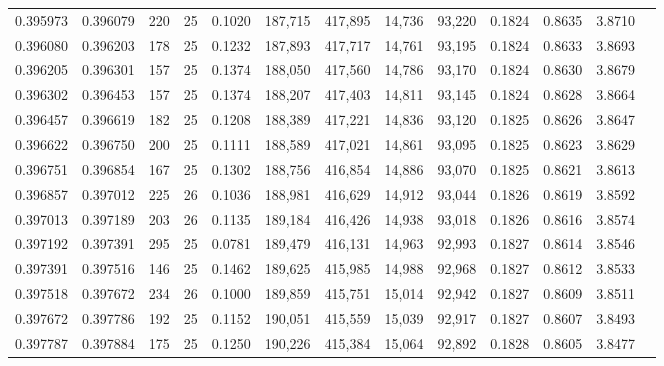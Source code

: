 \begin{tabular}{rrrrrrrrrrrrr}
0.395973 & 0.396079 & 220 &  25 &                                     0.1020 & 187,715 & 417,895 &  14,736 &  93,220 & 0.1824 & 0.8635 & 3.8710 \\
0.396080 & 0.396203 & 178 &  25 &                                     0.1232 & 187,893 & 417,717 &  14,761 &  93,195 & 0.1824 & 0.8633 & 3.8693 \\
0.396205 & 0.396301 & 157 &  25 &                                     0.1374 & 188,050 & 417,560 &  14,786 &  93,170 & 0.1824 & 0.8630 & 3.8679 \\
0.396302 & 0.396453 & 157 &  25 &                                     0.1374 & 188,207 & 417,403 &  14,811 &  93,145 & 0.1824 & 0.8628 & 3.8664 \\
0.396457 & 0.396619 & 182 &  25 &                                     0.1208 & 188,389 & 417,221 &  14,836 &  93,120 & 0.1825 & 0.8626 & 3.8647 \\
0.396622 & 0.396750 & 200 &  25 &                                     0.1111 & 188,589 & 417,021 &  14,861 &  93,095 & 0.1825 & 0.8623 & 3.8629 \\
0.396751 & 0.396854 & 167 &  25 &                                     0.1302 & 188,756 & 416,854 &  14,886 &  93,070 & 0.1825 & 0.8621 & 3.8613 \\
0.396857 & 0.397012 & 225 &  26 &                                     0.1036 & 188,981 & 416,629 &  14,912 &  93,044 & 0.1826 & 0.8619 & 3.8592 \\
0.397013 & 0.397189 & 203 &  26 &                                     0.1135 & 189,184 & 416,426 &  14,938 &  93,018 & 0.1826 & 0.8616 & 3.8574 \\
0.397192 & 0.397391 & 295 &  25 &                                     0.0781 & 189,479 & 416,131 &  14,963 &  92,993 & 0.1827 & 0.8614 & 3.8546 \\
0.397391 & 0.397516 & 146 &  25 &                                     0.1462 & 189,625 & 415,985 &  14,988 &  92,968 & 0.1827 & 0.8612 & 3.8533 \\
0.397518 & 0.397672 & 234 &  26 &                                     0.1000 & 189,859 & 415,751 &  15,014 &  92,942 & 0.1827 & 0.8609 & 3.8511 \\
0.397672 & 0.397786 & 192 &  25 &                                     0.1152 & 190,051 & 415,559 &  15,039 &  92,917 & 0.1827 & 0.8607 & 3.8493 \\
0.397787 & 0.397884 & 175 &  25 &                                     0.1250 & 190,226 & 415,384 &  15,064 &  92,892 & 0.1828 & 0.8605 & 3.8477 \\

\end{tabular}
